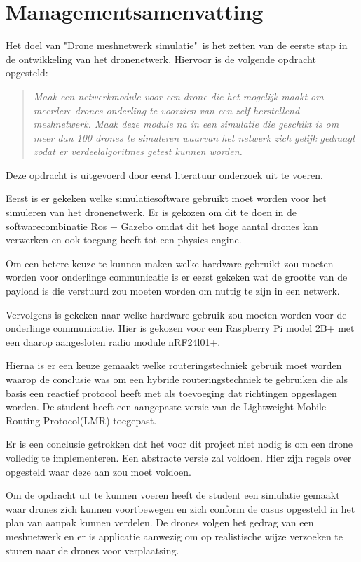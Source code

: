 \documentclass[a4paper, 11pt, oneside]{report}
\begin{document}
\chapter*{Managementsamenvatting}\label{sec:managementsamenvatting}
Het doel van "Drone meshnetwerk simulatie"\ is het zetten van de eerste stap in de ontwikkeling van het dronenetwerk. Hiervoor is de volgende opdracht opgesteld:
\begin{quotation}
	\textit{Maak een netwerkmodule voor een drone die het mogelijk maakt om meerdere drones onderling te voorzien van een zelf herstellend meshnetwerk. Maak deze module na in een simulatie die geschikt is om meer dan 100 drones te simuleren waarvan het netwerk zich gelijk gedraagt zodat er verdeelalgoritmes getest kunnen worden.}
\end{quotation}

Deze opdracht is uitgevoerd door eerst literatuur onderzoek uit te voeren.

Eerst is er gekeken welke simulatiesoftware gebruikt moet worden voor het simuleren van het dronenetwerk.
Er is gekozen om dit te doen in de softwarecombinatie Ros + Gazebo omdat dit het hoge aantal drones kan verwerken en ook toegang heeft tot een physics engine.

Om een betere keuze te kunnen maken welke hardware gebruikt zou moeten worden voor onderlinge communicatie is er eerst gekeken wat de grootte van de payload is die verstuurd zou moeten worden om nuttig te zijn in een netwerk.

Vervolgens is gekeken naar welke hardware gebruik zou moeten worden voor de onderlinge communicatie. Hier is gekozen voor een Raspberry Pi model 2B+ met een daarop aangesloten radio module nRF24l01+.

Hierna is er een keuze gemaakt welke routeringstechniek gebruik moet worden waarop de conclusie was om een hybride routeringstechniek te gebruiken die als basis een reactief protocol heeft met als toevoeging dat richtingen opgeslagen worden. De student heeft een aangepaste versie van de Lightweight Mobile Routing Protocol(LMR) toegepast. 

Er is een conclusie getrokken dat het voor dit project niet nodig is om een drone volledig te implementeren. Een abstracte versie zal voldoen. Hier zijn regels over opgesteld waar deze aan zou moet voldoen. 

Om de opdracht uit te kunnen voeren heeft de student een simulatie gemaakt waar drones zich kunnen voortbewegen en zich conform de casus opgesteld in het plan van aanpak kunnen verdelen. De drones volgen het gedrag van een meshnetwerk en er is applicatie aanwezig om op realistische wijze verzoeken te sturen naar de drones voor verplaatsing. 
\end{document}
